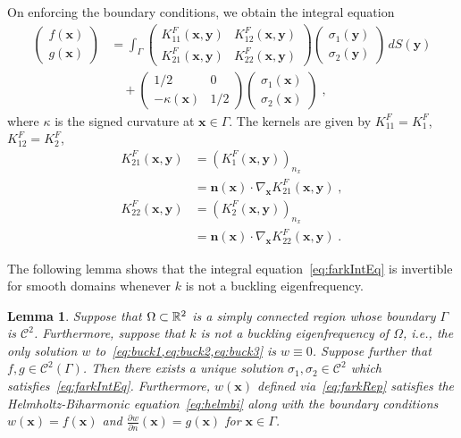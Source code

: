 \documentclass[preprint,12pt]{article}
\def\bn{{\boldsymbol n}}
\def\xx{{\boldsymbol x}}
\def\bx{{\boldsymbol x}}
\def\yy{{\boldsymbol y}}
\newcommand\dwdn{\frac{\partial w}{\partial n}}
\newcommand{\cC}{\mathcal C}
\newtheorem{lem}{Lemma}
\begin{document}
On enforcing the boundary conditions, we obtain the integral equation
\begin{equation}
  \begin{split}
    \begin{pmatrix}
      f(\xx) \\
      g(\xx)
    \end{pmatrix} &= 
    \int_\Gamma
    \begin{pmatrix}
      K_{11}^F(\xx,\yy) & K_{12}^F(\xx,\yy) \\
      K_{21}^F(\xx,\yy) & K_{22}^F(\xx,\yy)
    \end{pmatrix}
    \begin{pmatrix}
      \sigma_1(\yy)\\
      \sigma_2(\yy)
    \end{pmatrix}
    \, dS(\yy) \\
    &\quad + \begin{pmatrix}
      1/2 & 0 \\
      -\kappa(\xx) & 1/2
    \end{pmatrix}
    \begin{pmatrix}
      \sigma_1(\xx)\\
      \sigma_2(\xx)
    \end{pmatrix} \; , \label{eq:farkIntEq} 
  \end{split}
\end{equation}
where $\kappa$ is the signed curvature at $\xx \in \Gamma$.
The kernels are given
by $K_{11}^F = K_1^F$, $K_{12}^F = K_2^F$,
\begin{align}
  K_{21}^F(\xx,\yy) &= \left(K_1^F(\xx,\yy)\right )_{n_x} \nonumber \\
  &= \bn(\xx) \cdot \nabla_{\xx} K_{21}^{F}(\xx,\yy) \; \label{eq:farkK21},\\
  K_{22}^F(\xx,\yy) &= \left(K_2^F(\xx,\yy)\right )_{n_x} \nonumber \\
  &= \bn(\xx) \cdot \nabla_{\xx} K_{22}^{F}(\xx,\yy) \label{eq:farkK22} \; .
\end{align}

The following lemma shows that the integral equation~\cref{eq:farkIntEq} is invertible for smooth domains
whenever $k$ is not a buckling eigenfrequency. 

\begin{lem}
Suppose that $\Omega \subset \mathbb{R}^2$ is a simply connected region whose boundary $\Gamma$ is $\cC^{2}$. 
Furthermore, suppose that $k$ is not a buckling eigenfrequency of $\Omega$, i.e., the only solution $w$ to~\cref{eq:buck1,eq:buck2,eq:buck3} is  $w \equiv 0$. Suppose further that $f,g \in \cC^{2}(\Gamma)$. 
Then there exists a unique solution $\sigma_{1},\sigma_{2} \in \cC^{2}$ which satisfies~\cref{eq:farkIntEq}. 
Furthermore, $w(\bx)$ defined via~\cref{eq:farkRep} satisfies the Helmholtz-Biharmonic equation~\cref{eq:helmbi}
along with the boundary conditions $w(\bx)=f(\bx)$ and $\dwdn(\bx) = g(\bx)$ for $\bx \in\Gamma$. 
\end{lem}
\end{document}
